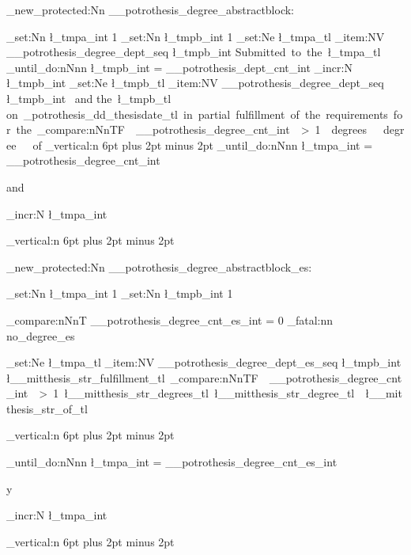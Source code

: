 \cs_new_protected:Nn \__potrothesis_degree_abstractblock: { %
	\int_set:Nn  \l_tmpa_int {1}
	\int_set:Nn  \l_tmpb_int {1}
	\tl_set:Ne \l_tmpa_tl { \seq_item:NV \g__potrothesis_degree_dept_seq \l_tmpb_int }
	{Submitted\ to\ the\ \l_tmpa_tl} 
	\int_until_do:nNnn { \l_tmpb_int } = { \g__potrothesis_dept_cnt_int } {
		\int_incr:N      \l_tmpb_int
		\tl_set:Ne \l_tmpb_tl { \seq_item:NV \g__potrothesis_degree_dept_seq \l_tmpb_int }
		\mbox {\ and}\linebreak
		\mbox {the\ \l_tmpb_tl }
	}
    \linebreak \mbox{on\ \g_potrothesis_dd_thesisdate_tl\ in\ partial\ fulfillment\ of\ the\ requirements\ for\ the\ 
		\int_compare:nNnTF { \g__potrothesis_degree_cnt_int } > {1} { degrees } { degree }
	\ of}
	\skip_vertical:n { 6pt plus 2pt minus 2pt }
	\int_until_do:nNnn { \l_tmpa_int } = { \g__potrothesis_degree_cnt_int } {
    	 \par and \par
		\int_incr:N     \l_tmpa_int
		}
    \skip_vertical:n { 6pt plus 2pt minus 2pt }
}
\cs_new_protected:Nn \__potrothesis_degree_abstractblock_es: {
    \int_set:Nn  \l_tmpa_int {1}
    \int_set:Nn  \l_tmpb_int {1}
    
    \int_compare:nNnT { \g__potrothesis_degree_cnt_es_int } = {0}
        { 
          \msg_fatal:nn { \ClassName } { no_degree_es }
        }

    \tl_set:Ne \l_tmpa_tl { \seq_item:NV \g__potrothesis_degree_dept_es_seq \l_tmpb_int }   
     \mbox {\l__mitthesis_str_fulfillment_tl\space
		\int_compare:nNnTF { \g__potrothesis_degree_cnt_int } > {1} {\l__mitthesis_str_degrees_tl} {\l__mitthesis_str_degree_tl}
	\ \l__mitthesis_str_of_tl\ }
	\par
    
    \skip_vertical:n { 6pt plus 2pt minus 2pt }
    
    \int_until_do:nNnn { \l_tmpa_int } = { \g__potrothesis_degree_cnt_es_int } {
         \par y \par
        \int_incr:N     \l_tmpa_int
        }
    
    \skip_vertical:n { 6pt plus 2pt minus 2pt }
}

\ExplSyntaxOff